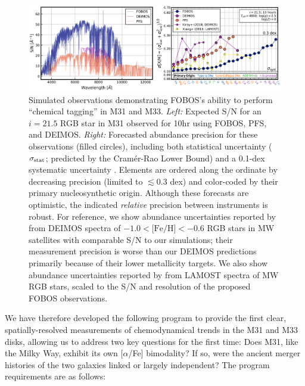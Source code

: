 \documentclass[11pt,a4paper,twoside,onecolumn,openany,final,oldfontcommands]{memoir}
\begin{document}
\begin{figure}
\includegraphics[width=1.0\textwidth]{figs/abundances_snr_v6.png}
\caption[Simulated M31 RGB spectra and abundance forecasts]{Simulated observations demonstrating FOBOS's ability to perform ``chemical tagging'' in M31 and M33. \textit{Left:} Expected S/N for an $i=21.5$ RGB star in M31 observed for 10hr using FOBOS, PFS, and DEIMOS. \textit{Right:}  Forecasted abundance precision for these observations (filled circles), including both statistical uncertainty ($\sigma_{\rm stat}$; predicted by the Cram\'er-Rao Lower Bound) and a 0.1-dex systematic uncertainty \citep[$\sigma_{\rm syst}$; cf.,][]{kirby18, xiang2019}. Elements are ordered along the ordinate by decreasing precision (limited to $\lesssim$0.3 dex) and color-coded by their primary nucleosynthetic origin. Although these forecasts are optimistic, the indicated \textit{relative} precision between instruments is robust. For reference, we show abundance uncertainties reported by \citet[][purple squares]{kirby18} from DEIMOS spectra of $-1.0<\text{[Fe/H]}<-0.6$ RGB stars in MW satellites with comparable S/N to our simulations; their measurement precision is worse than our DEIMOS predictions primarily because of their lower metallicity targets.  We also show abundance uncertainties reported by \citet[][yellow squares]{xiang2019} from LAMOST spectra of MW RGB stars, scaled to the S/N and resolution of the proposed FOBOS  observations.}
\label{fig:abundances_snr}
\end{figure}



We have therefore developed the following program to provide the first clear, spatially-resolved measurements of chemodynamical trends in the M31 and M33 disks, allowing us to address two key questions for the first time: Does M31, like the Milky Way, exhibit its own [$\alpha$/Fe] bimodality?  If so, were the ancient merger histories of the two galaxies linked or largely independent? The program requirements are as follows:
\end{document}
